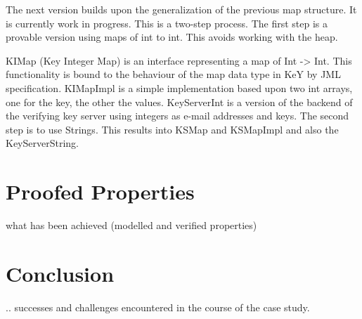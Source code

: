 \documentclass{llncs}
\begin{document}
The next version builds upon the generalization of the previous map structure.
It is currently work in progress. This is a two-step process. The first step is
a provable version using maps of int to int. This avoids working with the heap.

KIMap (Key Integer Map) is an interface representing a map of Int -> Int. This
functionality is bound to the behaviour of the map data type in KeY by JML
specification. KIMapImpl is a simple implementation based upon two int arrays,
one for the key, the other the values. KeyServerInt is a version of the backend
of the verifying key server using integers as e-mail addresses and keys. The
second step is to use Strings. This results into KSMap and KSMapImpl and also
the KeyServerString.

\section{Proofed Properties}

what has been achieved (modelled and verified properties)


\section{Conclusion }

.. successes and challenges encountered in the course of the case study.
\end{document}

